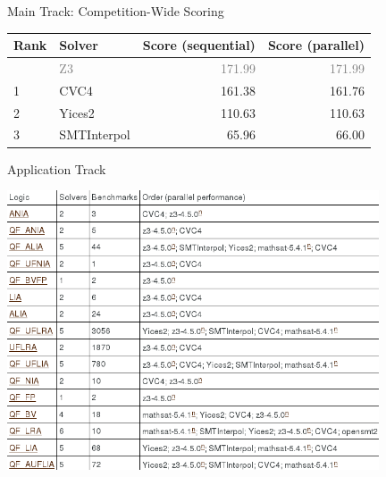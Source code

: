 \documentclass{beamer}
\begin{document}

\begin{frame}{Main Track: Competition-Wide Scoring}
  \begin{tabular}{llrr}
    Rank & Solver & Score (sequential) & Score (parallel)\\ \hline
         & \textcolor{gray}{Z3} & \textcolor{gray}{171.99} & \textcolor{gray}{171.99} \\
    1    & CVC4   & 161.38             & 161.76 \\
    2    & Yices2  & 110.63             & 110.63 \\
    3    & SMTInterpol  & 65.96              & 66.00 \\
  \end{tabular}  
\end{frame}





\begin{frame}{Application Track}

\includegraphics[width=11cm]{screenshots/Results-ApplicationTrack}

\end{frame}


\end{document}
